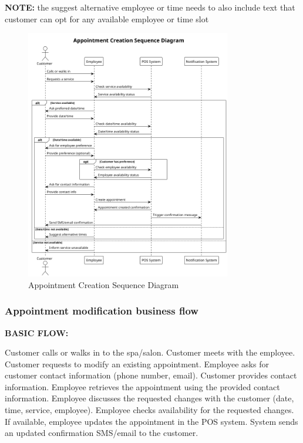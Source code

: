 \documentclass[]{VUMIFTemplateClass}
\newcommand{\noticecomment}[1]{%
    \begin{tcolorbox}[colback=blue!20, colframe=blue!60, arc=0pt, outer arc=0pt, boxrule=1pt, left=3pt, right=3pt, top=3pt, bottom=3pt]
        \textbf{\textcolor{blue!70!black}{NOTE:}} #1
    \end{tcolorbox}
}
\begin{document}
\noticecomment{the suggest alternative employee or time needs to also include text that customer can opt for any available employee or time slot}

\begin{figure}[H]
    \centering
    \includegraphics[width=0.8\textwidth]{images/diagrams/services/appointment_creation_sequence.png}
    \caption{Appointment Creation Sequence Diagram}
    \label{fig:appointment_creation_sequence}
\end{figure}

\subsubsection{Appointment modification business flow}

\textbf{BASIC FLOW:}

Customer calls or walks in to the spa/salon.
Customer meets with the employee.
Customer requests to modify an existing appointment.
Employee asks for customer contact information (phone number, email).
Customer provides contact information.
Employee retrieves the appointment using the provided contact information.
Employee discusses the requested changes with the customer (date, time, service, employee).
Employee checks availability for the requested changes.
If available, employee updates the appointment in the POS system.
System sends an updated confirmation SMS/email to the customer.
\end{document}
